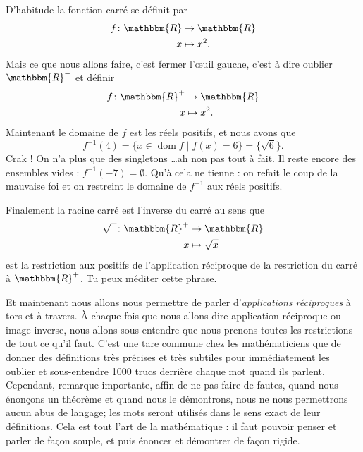 \documentclass[a4paper,12pt]{book}
\newcommand{\eR}{\mathbbm{R}}
\DeclareMathOperator{\dom}{dom}
\theoremstyle{mes_exemples}	\newtheorem{exemple}[numtho]{Exemple}
\theoremstyle{mes_tho}
\newcommand{\tq}{\mid}
\begin{document}
D'habitude la fonction carré se définit par
\begin{equation}
\begin{aligned}
 f\colon \eR&\to \eR \\ 
   x&\mapsto x^2. 
\end{aligned}
\end{equation}
Mais ce que nous allons faire, c'est fermer l'\oe uil gauche, c'est à dire oublier $\eR^-$ et définir
\begin{equation}
\begin{aligned}
 f\colon \eR^+&\to \eR \\ 
   x&\mapsto x^2. 
\end{aligned}
\end{equation}
Maintenant le domaine de $f$ est les réels positifs, et nous avons que 
\[ 
  f^{-1}(4)=\{ x\in\dom f\tq f(x)=6 \}=\{ \sqrt{6} \}.
\]
Crak ! On n'a plus que des singletons \ldots ah non pas tout à fait. Il reste encore des ensembles vides : $f^{-1}(-7)=\emptyset$. Qu'à cela ne tienne : on refait le coup de la mauvaise foi et on restreint le domaine de $f^{-1}$ aux réels positifs.
 
Finalement la racine carré est l'inverse du carré au sens que
\begin{equation}
\begin{aligned}
 \sqrt{\phantom{x}}\colon \eR^+&\to \eR \\ 
   x&\mapsto \sqrt{x} 
\end{aligned}
\end{equation}
est la restriction aux positifs de l'application réciproque de la restriction du carré à $\eR^+$. Tu peux méditer cette phrase.

Et maintenant nous allons nous permettre de parler d'\emph{applications réciproques} à tors et à travers. À chaque fois que nous allons dire \og application réciproque\fg{} ou \og image inverse\fg, nous allons sous-entendre que nous prenons toutes les restrictions de tout ce qu'il faut. C'est une tare commune chez les mathématiciens que de donner des définitions très précises et très subtiles pour immédiatement les oublier et sous-entendre 1000 trucs derrière chaque mot quand ils parlent. Cependant, remarque importante, affin de ne pas faire de fautes, quand nous énonçons un théorème et quand nous le démontrons, nous ne nous permettrons aucun abus de langage; les mots seront utilisés dans le sens exact de leur définitions. Cela est tout l'art de la mathématique : il faut pouvoir penser et parler de façon souple, et puis énoncer et démontrer de façon rigide.
\end{document}
